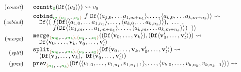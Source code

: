 \begin{figure}[t]
\begin{equation*}
\begin{array}{rl}
{\footnotesize(\emph{counit})} & \begin{array}{l}
\ident{counit}_{\cclrd{0}}(\ident{Df} \langle\langle v_0 \rangle\rangle)   \rightsquigarrow v_0
\end{array}
\\[0.25em]
{\footnotesize(\emph{cobind})} & \begin{array}{l}
\ident{cobind}_{\cclrd{m}, \alift{\cclrd{n_1},\ldots,\cclrd{n_k}}}~f~\ident{Df}\langle \langle a_{1,0}, \ldots a_{1,m+{n_1}} \rangle, \ldots, \langle a_{k,0}, \ldots a_{k,m+{n_k}} \rangle \rangle \rightsquigarrow \\[-0.25em]
\quad \ident{Df}\langle\langle\; f (\ident{Df}\langle \langle a_{1,0}, \ldots a_{1,{n_1}} \rangle, \ldots, \langle a_{k,0}, \ldots a_{k,{n_k}} \rangle \rangle), ~\ldots~, \\[-0.25em]
\qquad ~~~\, f (\ident{Df}\langle \langle a_{1,m}, \ldots a_{1,m+{n_1}} \rangle, \ldots, \langle a_{k,m}, \ldots a_{k,m+{n_k}} \rangle \rangle)~\; \rangle\rangle
\end{array}
\\[0.25em]
{\footnotesize(\emph{merge})} & \begin{array}{l}
\ident{merge}_{\alift{\cclrd{m_0},\ldots,\cclrd{m_k}}, \alift{\cclrd{n_0},\ldots,\cclrd{n_l}}} ((\ident{Df}\langle \textbf{v}_0, \ldots, \textbf{v}_k \rangle), (\ident{Df}\langle \textbf{v}'_0, \ldots, \textbf{v}'_l\rangle)) \rightsquigarrow
\\[-0.25em]
\quad \ident{Df}\langle \textbf{v}_0, \ldots, \textbf{v}_k, \textbf{v}'_0, \ldots, \textbf{v}'_l \rangle
\end{array}
\\[0.25em]
{\footnotesize(\emph{split})} & \begin{array}{l}
\ident{split}_{\alift{\cclrd{m_0},\ldots,\cclrd{m_k}}, \alift{\cclrd{n_0},\ldots,\cclrd{n_l}}} (\ident{Df}\langle \textbf{v}_0, \ldots, \textbf{v}_k, \textbf{v}'_0, \ldots, \textbf{v}'_l \rangle)  \rightsquigarrow
\\[-0.25em]
\quad (\ident{Df}\langle \textbf{v}_0, \ldots, \textbf{v}_k \rangle, ~\ident{Df}\langle \textbf{v}'_0, \ldots, \textbf{v}'_l\rangle)
\end{array}
\\[0.25em]
{\footnotesize(\emph{prev})} & \begin{array}{l}
\ident{prev}_{\alift{\cclrd{n_1},\ldots,\cclrd{n_k}}} (\ident{Df}\langle\langle v_{1,0}, \ldots, v_{1, n_1}, v_{1,{n_1}+1} \rangle,\ldots,\langle v_{k,0}, \ldots, v_{k, n_k}, v_{k,{n_k}+1} \rangle\rangle) \rightsquigarrow

\end{array}
\end{array}
\end{equation*}
\end{figure}
